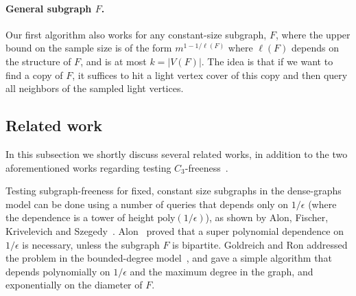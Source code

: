 \documentclass{article}
\newcommand{\eps}{\epsilon}
\newcommand{\poly}{\textrm{poly}}
\newcommand{\commentt}[1]{ {}}
\newcommand{\reut}[1]{ {}}
\begin{document}
 \paragraph{General subgraph $F$.}
 Our first algorithm also works for any constant-size subgraph, $F$, where the upper bound on the sample size is of the form $m^{1-1/\ell(F)}$ where $\ell(F)$ depends on the structure of $F$, and is at most $k=|V(F)|$.
 The idea is that if we want to find a copy of $F$, it suffices to hit a light vertex cover of this copy and then query all neighbors of the sampled light vertices. 



\subsection{Related work}\label{subsec:related}
In this subsection we shortly discuss several related works, in addition to the two aforementioned works regarding testing $C_3$-freeness~\cite{AKKR08,Reut}.

Testing subgraph-freeness for fixed, constant size subgraphs in the dense-graphs model can be done using a number of queries that depends only on $1/\eps$ (where the dependence is a tower of height $\poly(1/\eps)$), as shown by Alon, Fischer, Krivelevich and Szegedy~\cite{AFKS00}.  Alon~\cite{Alo02} proved that a super polynomial dependence on $1/\eps$ is necessary, unless the subgraph $F$ is bipartite. Goldreich and Ron addressed the problem in the bounded-degree model~\cite{GR-bound}, and gave a simple algorithm that depends polynomially on $1/\eps$ and the maximum degree in the graph, and exponentially on the diameter of $F$.
\end{document}

